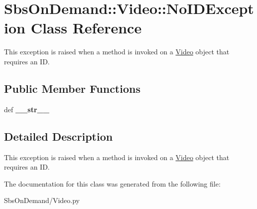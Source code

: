 \hypertarget{class_sbs_on_demand_1_1_video_1_1_no_i_d_exception}{
\section{\-Sbs\-On\-Demand\-:\-:\-Video\-:\-:\-No\-I\-D\-Exception \-Class \-Reference}
\label{class_sbs_on_demand_1_1_video_1_1_no_i_d_exception}
}


\-This exception is raised when a method is invoked on a \hyperlink{class_sbs_on_demand_1_1_video_1_1_video}{\-Video} object that requires an \-I\-D.  


\subsection*{\-Public \-Member \-Functions}
\begin{DoxyCompactItemize}
\item 
\hypertarget{class_sbs_on_demand_1_1_video_1_1_no_i_d_exception_a539c6dd17804c19b1b5e9b9c0af0d1c1}{
def {\bfseries \-\_\-\-\_\-str\-\_\-\-\_\-}}
\label{class_sbs_on_demand_1_1_video_1_1_no_i_d_exception_a539c6dd17804c19b1b5e9b9c0af0d1c1}

\end{DoxyCompactItemize}


\subsection{\-Detailed \-Description}
\-This exception is raised when a method is invoked on a \hyperlink{class_sbs_on_demand_1_1_video_1_1_video}{\-Video} object that requires an \-I\-D. 

\-The documentation for this class was generated from the following file\-:\begin{DoxyCompactItemize}
\item 
\-Sbs\-On\-Demand/\-Video.\-py\end{DoxyCompactItemize}
